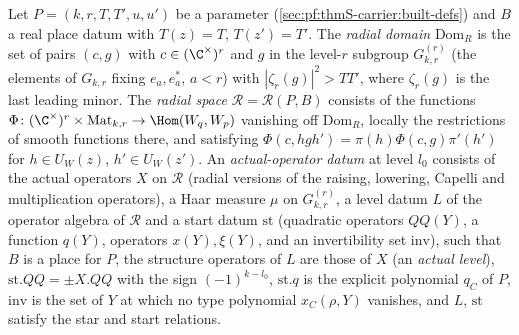 \begin{definition}\label{pf:sh-curv:raddef}
Let $P=(k,r,T,T',u,u')$ be a parameter (\cref{sec:pf:thmS-carrier:built-defs}) and $B$ a real place datum with $T(z)=T$,
$T(z')=T'$. The \emph{radial domain} $\mathrm{Dom}_R$ is the set of pairs $(c,g)$ with $c\in(\C^\times)^r$ and $g$ in the
level-$r$ subgroup $G^{(r)}_{k,r}$ (the elements of $G_{k,r}$ fixing $e_a,e^*_a$, $a<r$) with $|\zeta_r(g)|^2>TT'$, where
$\zeta_r(g)$ is the last leading minor. The \emph{radial space} $\mathcal R=\mathcal R(P,B)$ consists of the functions
$\Phi\colon(\C^\times)^r\times\mathrm{Mat}_{k,r}\to\Hom(W_q,W_p)$ vanishing off $\mathrm{Dom}_R$, locally the restrictions of
smooth functions there, and satisfying $\Phi(c,hgh')=\pi(h)\Phi(c,g)\pi'(h')$ for $h\in U_W(z)$, $h'\in U_W(z')$. An
\emph{actual-operator datum} at level $l_0$ consists of the actual operators $X$ on $\mathcal R$ (radial versions of the
raising, lowering, Capelli and multiplication operators), a Haar measure $\mu$ on $G^{(r)}_{k,r}$, a level datum $L$ of the
operator algebra of $\mathcal R$ and a start datum $\mathrm{st}$ (quadratic operators $QQ(Y)$, a function $q(Y)$, operators
$x(Y),\xi(Y)$, and an invertibility set $\mathrm{inv}$), such that $B$ is a place for $P$, the structure operators of $L$ are
those of $X$ (an \emph{actual level}), $\mathrm{st}.QQ=\pm X.QQ$ with the sign $(-1)^{k-l_0}$, $\mathrm{st}.q$ is the
explicit polynomial $q_C$ of $P$, $\mathrm{inv}$ is the set of $Y$ at which no type polynomial $x_C(\rho,Y)$ vanishes, and $L$,
$\mathrm{st}$ satisfy the star and start relations.
\end{definition}

